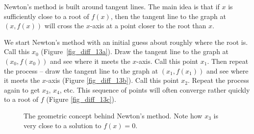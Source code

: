 Newton's method is built around tangent lines.  The main idea is that if $x$ is sufficiently close to a root of $f(x)$, then the  tangent line to the graph at $(x,f(x))$ will cross the $x$-axis at a point closer to the root than $x$.  

We start Newton's method with an initial guess about roughly where the root is.  Call this $x_0$ (Figure~\ref{fig_diff_13a}).  Draw the tangent line to the graph at $(x_0,f(x_0))$ and see where it meets the $x$-axis. Call this point $x_1$.  Then repeat the process -- draw the tangent line to the graph at $(x_1, f(x_1))$ and see where it meets the $x$-axis (Figure \ref{fig_diff_13b}). Call this point $x_2$.  Repeat the process again to get $x_3$, $x_4$, etc.  This sequence of points will often converge rather quickly to a root of $f$ (Figure \ref{fig_diff_13c}).  


\begin{figure}[h]
\centering
{}
\qquad
{}
\qquad
{}
\caption{The geometric concept behind Newton's method. Note how $x_3$ is very close to a solution to $f(x) = 0$. }
\end{figure}


